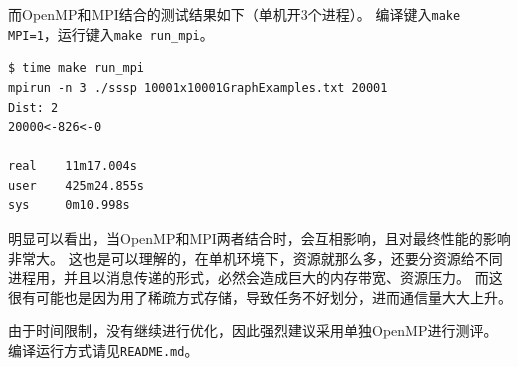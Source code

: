\documentclass[reportComp]{thesis}
\begin{document}



而OpenMP和MPI结合的测试结果如下（单机开3个进程）。
编译键入\verb'make MPI=1'，运行键入\verb'make run_mpi'。
\begin{lstlisting}
$ time make run_mpi
mpirun -n 3 ./sssp 10001x10001GraphExamples.txt 20001
Dist: 2
20000<-826<-0

real    11m17.004s
user    425m24.855s
sys     0m10.998s
\end{lstlisting}

明显可以看出，当OpenMP和MPI两者结合时，会互相影响，且对最终性能的影响非常大。
这也是可以理解的，在单机环境下，资源就那么多，还要分资源给不同进程用，并且以消息传递的形式，必然会造成巨大的内存带宽、资源压力。
而这很有可能也是因为用了稀疏方式存储，导致任务不好划分，进而通信量大大上升。

由于时间限制，没有继续进行优化，因此强烈建议采用单独OpenMP进行测评。
编译运行方式请见\verb'README.md'。
\end{document}

